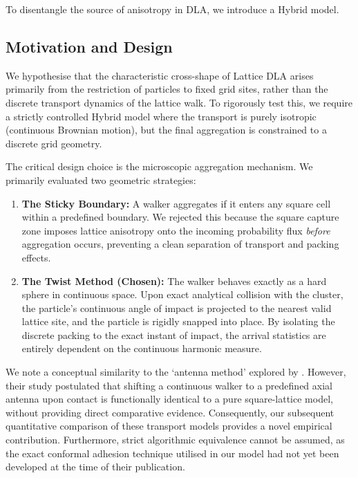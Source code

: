 \documentclass[12pt, a4paper, oneside]{report}
\theoremstyle{remark}
\begin{document}
To disentangle the source of anisotropy in DLA, we introduce a Hybrid model.

\subsection{Motivation and Design}
We hypothesise that the characteristic cross-shape of Lattice DLA arises primarily from the restriction of particles to fixed grid sites, rather than the discrete transport dynamics of the lattice walk. To rigorously test this, we require a strictly controlled Hybrid model where the transport is purely isotropic (continuous Brownian motion), but the final aggregation is constrained to a discrete grid geometry.

The critical design choice is the microscopic aggregation mechanism. We primarily evaluated two geometric strategies:

\begin{enumerate}
    \item \textbf{The Sticky Boundary:} A walker aggregates if it enters any square cell within a predefined boundary. We rejected this because the square capture zone imposes lattice anisotropy onto the incoming probability flux \textit{before} aggregation occurs, preventing a clean separation of transport and packing effects.
    
    \item \textbf{The Twist Method (Chosen):} The walker behaves exactly as a hard sphere in continuous space. Upon exact analytical collision with the cluster, the particle's continuous angle of impact is projected to the nearest valid lattice site, and the particle is rigidly snapped into place. By isolating the discrete packing to the exact instant of impact, the arrival statistics are entirely dependent on the continuous harmonic measure.
\end{enumerate}

We note a conceptual similarity to the `antenna method' explored by \citet{Menshutin2011}. However, their study postulated that shifting a continuous walker to a predefined axial antenna upon contact is functionally identical to a pure square-lattice model, without providing direct comparative evidence. Consequently, our subsequent quantitative comparison of these transport models provides a novel empirical contribution. Furthermore, strict algorithmic equivalence cannot be assumed, as the exact conformal adhesion technique utilised in our model had not yet been developed at the time of their publication.
\end{document}
